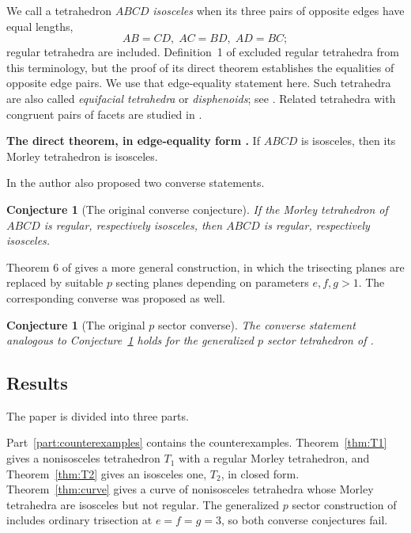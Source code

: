 \documentclass[11pt]{article}
\newtheorem{conjecture}[theorem]{Conjecture}
\theoremstyle{definition}
\theoremstyle{remark}
\begin{document}
We call a tetrahedron $ABCD$ \emph{isosceles} when its three pairs of opposite edges have equal lengths,
\[
AB=CD,\; AC=BD,\; AD=BC;
\]
regular tetrahedra are included. Definition~1 of \cite{TranActa} excluded regular tetrahedra from this terminology, but the proof of its direct theorem establishes the equalities of opposite edge pairs. We use that edge-equality statement here. Such tetrahedra are also called \emph{equifacial tetrahedra} or \emph{disphenoids}; see \cite{BrandtsKrizek,HajjaWalker,Leech}. Related tetrahedra with congruent pairs of facets are studied in \cite{Klain,TranVolume}.

\medskip

\noindent
\textbf{The direct theorem, in edge-equality form \cite{TranActa}.} If $ABCD$ is isosceles, then its Morley tetrahedron is isosceles.

\medskip

In \cite{TranActa} the author also proposed two converse statements.

\begin{conjecture}[The original converse conjecture]
\label{conj:old1} If the Morley tetrahedron of $ABCD$ is regular, respectively isosceles, then $ABCD$ is regular, respectively isosceles.
\end{conjecture}

Theorem 6 of \cite{TranActa} gives a more general construction, in which the trisecting planes are replaced by suitable $p$ secting planes depending on parameters $e,f,g>1$. The corresponding converse was proposed as well.

\begin{conjecture}[The original $p$ sector converse]
\label{conj:old2} The converse statement analogous to Conjecture~\ref{conj:old1} holds for the generalized $p$ sector tetrahedron of \cite[Theorem 6]{TranActa}.
\end{conjecture}

\subsection*{Results}

The paper is divided into three parts.

Part~\ref{part:counterexamples} contains the counterexamples. Theorem~\ref{thm:T1} gives a nonisosceles tetrahedron $T_1$ with a regular Morley tetrahedron, and Theorem~\ref{thm:T2} gives an isosceles one, $T_2$, in closed form. Theorem~\ref{thm:curve} gives a curve of nonisosceles tetrahedra whose Morley tetrahedra are isosceles but not regular. The generalized $p$ sector construction of \cite{TranActa} includes ordinary trisection at $e=f=g=3$, so both converse conjectures fail.
\end{document}
